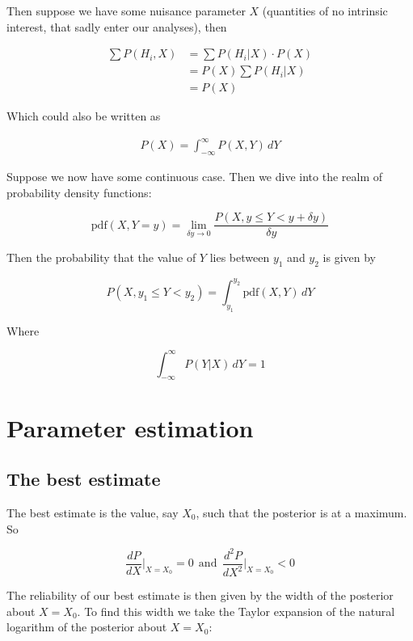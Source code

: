 \documentclass[a4paper]{article}
\begin{document}
Then suppose we have some nuisance parameter $X$ (quantities of no intrinsic interest, that sadly enter our analyses), then 

\begin{align}
	\sum P(H_i,X) &= \sum P(H_i|X)\cdot P(X)\\[1em]
	&= P(X)\sum P(H_i|X)\\[1em]
	&= P(X)
\end{align}

Which could also be written as

\begin{align}
	P(X)=\int_{-\infty}^{\infty} P(X,Y)\,dY
\end{align}

Suppose we now have some continuous case. Then we dive into the realm of probability density functions:

\begin{equation}
	\text{pdf}(X, Y=y) = \lim_{\delta y\rightarrow 0} \frac{P(X, y\le Y < y+\delta y)}{\delta y}
\end{equation} 

Then the probability that the value of $Y$ lies between $y_1$ and $y_2$ is given by

\begin{equation}
	P(X, y_1\le Y < y_2)=\int_{y_1}^{y_2}\text{pdf}(X, Y)\,dY
\end{equation}

Where 

\begin{equation}
	\int_{-\infty}^{\infty} P(Y|X)\,dY = 1
\end{equation}

\section{Parameter estimation}

\subsection{The best estimate}

The best estimate is the value, say $X_0$, such that the posterior is at a maximum. So

\begin{equation}
	\frac{dP}{dX}\bigg|_{X=X_0}=0\ \ \text{and}\ \  \frac{d^2P}{dX^2}\bigg|_{X=X_0}<0
\end{equation}

The reliability of our best estimate is then given by the width of the posterior about $X=X_0$. To find this width we take the Taylor expansion of the natural logarithm of the posterior about $X=X_0$:
\end{document}

